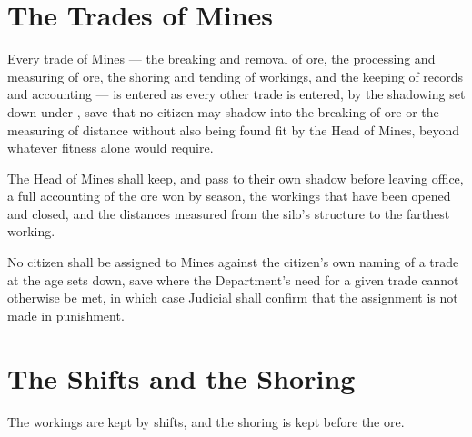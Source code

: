 \section{The Trades of Mines}
\label{sec:mines:trades-of-mines}

Every trade of Mines --- the breaking and removal of ore, the processing and measuring of ore, the shoring and tending of workings, and the keeping of records and accounting --- is entered as every other trade is entered, by the shadowing set down under , save that no citizen may shadow into the breaking of ore or the measuring of distance without also being found fit by the Head of Mines, beyond whatever fitness  alone would require.

\begin{clauses}
\item The Head of Mines shall keep, and pass to their own shadow before leaving office, a full accounting of the ore won by season, the workings that have been opened and closed, and the distances measured from the silo's structure to the farthest working.
\item No citizen shall be assigned to Mines against the citizen's own naming of a trade at the age  sets down, save where the Department's need for a given trade cannot otherwise be met, in which case Judicial shall confirm that the assignment is not made in punishment.
\end{clauses}

\section{The Shifts and the Shoring}
\label{sec:mines:shifts-and-the-shoring}

The workings are kept by shifts, and the shoring is kept before the ore.

